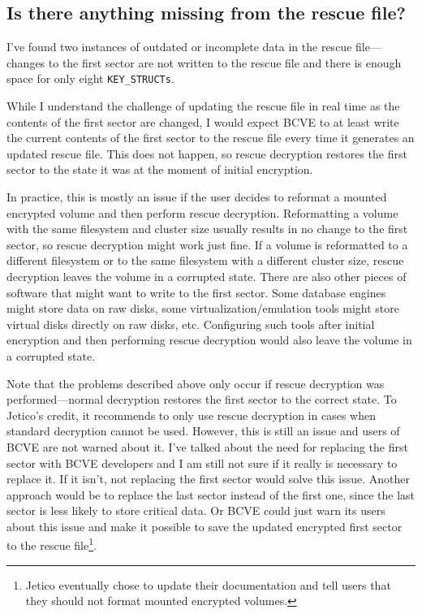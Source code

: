\documentclass[thesis=B,english]{FITthesis}[2012/10/20]
\begin{document}
	\subsection{Is there anything missing from the rescue file?}
	
	I've found two instances of outdated or incomplete data in the rescue file---changes to the first sector are not written to the rescue file and there is enough space for only eight \verb|KEY_STRUCTs|.
	
	While I understand the challenge of updating the rescue file in real time as the contents of the first sector are changed, I would expect BCVE to at least write the current contents of the first sector to the rescue file every time it generates an updated rescue file. This does not happen, so rescue decryption restores the first sector to the state it was at the moment of initial encryption. 
	
	In practice, this is mostly an issue if the user decides to reformat a mounted encrypted volume and then perform rescue decryption. Reformatting a volume with the same filesystem and cluster size usually results in no change to the first sector, so rescue decryption might work just fine. If a volume is reformatted to a different filesystem or to the same filesystem with a different cluster size, rescue decryption leaves the volume in a corrupted state. There are also other pieces of software that might want to write to the first sector. Some database engines might store data on raw disks, some virtualization/emulation tools might store virtual disks directly on raw disks, etc. Configuring such tools after initial encryption and then performing rescue decryption would also leave the volume in a corrupted state.
	
	Note that the problems described above only occur if rescue decryption was performed---normal decryption restores the first sector to the correct state. To Jetico's credit, it recommends to only use rescue decryption in cases when standard decryption cannot be used. However, this is still an issue and users of BCVE are not warned about it. I've talked about the need for replacing the first sector with BCVE developers and I am still not sure if it really is necessary to replace it. If it isn't, not replacing the first sector would solve this issue. Another approach would be to replace the last sector instead of the first one, since the last sector is less likely to store critical data. Or BCVE could just warn its users about this issue and make it possible to save the updated encrypted first sector to the rescue file\footnote{Jetico eventually chose to update their documentation and tell users that they should not format mounted encrypted volumes.}.
	
\end{document}

